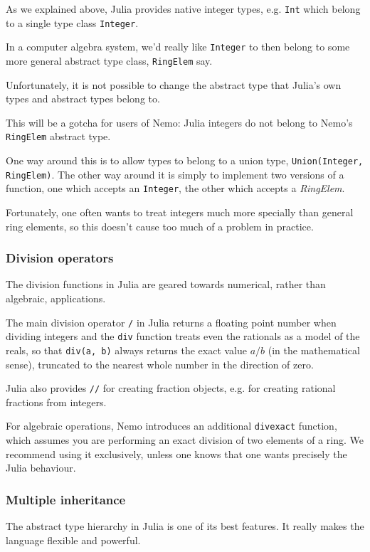 \documentclass[a4paper,10pt]{article}
\newcommand{\code}{\lstinline}
\begin{document}
As we explained above, Julia provides native integer types, e.g. \code{Int} which belong to a single
type class \code{Integer}.

In a computer algebra system, we'd really like \code{Integer} to then belong to some more general
abstract type class, \code{RingElem} say.

Unfortunately, it is not possible to change the abstract type that Julia's own types and abstract types
belong to.

This will be a gotcha for users of Nemo: Julia integers do not belong to Nemo's \code{RingElem} abstract
type.

One way around this is to allow types to belong to a union type, \code{Union(Integer, RingElem)}. The
other way around it is simply to implement two versions of a function, one which accepts an
\code{Integer}, the other which accepts a \emph{RingElem}.

Fortunately, one often wants to treat integers much more specially than general ring elements, so this
doesn't cause too much of a problem in practice.

\subsubsection{Division operators}

The division functions in Julia are geared towards numerical, rather than algebraic, applications.

The main division operator \code{/} in Julia returns a floating point number when dividing integers
and the \code{div} function treats even the rationals as a model of the reals, so that \code{div(a, b)}
always returns the exact value $a/b$ (in the mathematical sense), truncated to the nearest whole
number in the direction of zero.

Julia also provides \code{//} for creating fraction objects, e.g. for creating rational fractions from
integers.

For algebraic operations, Nemo introduces an additional \code{divexact} function, which assumes you are
performing an exact division of two elements of a ring. We recommend using it exclusively, unless one
knows that one wants precisely the Julia behaviour.

\subsubsection{Multiple inheritance}

The abstract type hierarchy in Julia is one of its best features. It really makes the language
flexible and powerful.
\end{document}
